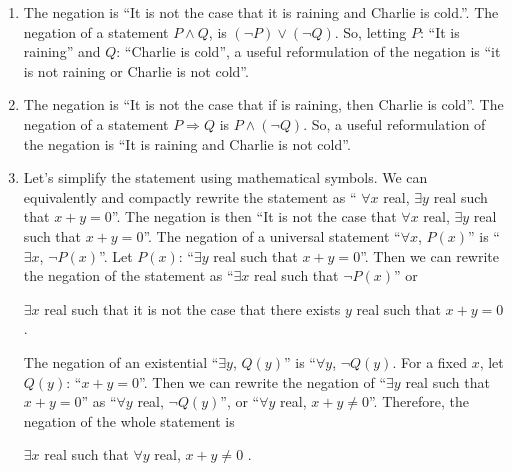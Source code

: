  \begin{problem}
 \begin{enumerate}[label=\alph*)]
 \item The negation is ``It is not the case that it is raining and Charlie is cold.''. The negation of a statement $P \wedge Q$, is $(\neg P) \vee (\neg Q)$. So, letting $P$: ``It is raining'' and $Q$: ``Charlie is cold'', a useful reformulation of the negation is ``it is not raining or Charlie is not cold''.
 \item The negation is ``It is not the case that if is raining, then Charlie is cold''. The negation of a statement $P \Rightarrow Q$ is $P \wedge (\neg Q)$. So, a useful reformulation of the negation is ``It is raining and Charlie is not cold''.
 \item Let's simplify the statement using mathematical symbols. We can equivalently and compactly rewrite the statement as `` $\forall x$ real, $\exists y$ real such that $x + y = 0$''. The negation is then ``It is not the case that $\forall x$ real, $\exists y$ real such that $x + y = 0$''. The negation of a universal statement ``$\forall x$, $P (x)$'' is ``$\exists x$, $\neg P(x)$''. Let $P (x)$: ``$\exists y$ real such that $x + y = 0$''. Then we can rewrite the negation of the statement as ``$\exists x$ real such that $\neg P (x)$'' or
 	\begin{center}
 	$\exists x$ real such that it is not the case that there exists $y$ real such that $x + y = 0$.
 	\end{center}
 The negation of an existential ``$\exists y$, $Q(y)$'' is ``$\forall y$, $\neg Q(y)$. For a fixed $x$, let $Q (y)$: ``$x + y = 0$''. Then we can rewrite the negation of ``$\exists y$ real such that $x + y = 0$'' as ``$\forall y$ real, $\neg Q (y)$'', or ``$\forall y$ real, $x + y \neq 0$''. Therefore, the negation of the whole statement is
 	\begin{center}
 	$\exists x$ real such that $\forall y$ real, $x + y \neq 0$ .
 	\end{center}
\end{enumerate}
 \end{problem}

